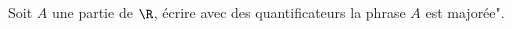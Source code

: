 Soit $A$ une partie de $\R$, \'{e}crire avec des quantificateurs la phrase \og$A$ est major\'ee"\fg.

\bigskip \bigskip